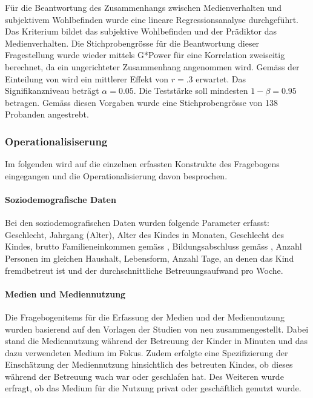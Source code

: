 Für die Beantwortung des Zusammenhangs zwischen Medienverhalten und subjektivem Wohlbefinden wurde eine lineare Regressionsanalyse durchgeführt. Das Kriterium bildet das subjektive Wohlbefinden und der Prädiktor das Medienverhalten. Die Stichprobengrösse für die Beantwortung dieser Fragestellung wurde wieder mittels G*Power für eine Korrelation zweiseitig berechnet, da ein ungerichteter Zusammenhang angenommen wird. Gemäss der Einteilung von  wird ein mittlerer Effekt von $r=.3$ erwartet. Das Signifikanzniveau beträgt $\alpha=0.05$. Die Teststärke soll mindesten $1-\beta=0.95$ betragen. Gemäss diesen Vorgaben wurde eine Stichprobengrösse von 138 Probanden angestrebt.


\subsubsection{Operationalisiserung} \label{sec:Operationalisierung}
Im folgenden wird auf die einzelnen erfassten Konstrukte des Fragebogens eingegangen und die Operationalisierung davon besprochen.

\paragraph{Soziodemografische Daten}\label{sec:SoziodemografischeDaten}
Bei den soziodemografischen Daten wurden folgende Parameter erfasst: Geschlecht, Jahrgang (Alter), Alter des Kindes in Monaten, Geschlecht des Kindes, brutto Familieneinkommen gemäss , Bildungsabschluss gemäss , Anzahl Personen im gleichen Haushalt, Lebensform, Anzahl Tage, an denen das Kind fremdbetreut ist und der durchschnittliche Betreuungsaufwand pro Woche.

\paragraph{Medien und Mediennutzung}\label{sec:MedienMediennutzung}
Die Fragebogenitems für die Erfassung der Medien und der Mediennutzung wurden basierend auf den Vorlagen der Studien von  neu zusammengestellt. Dabei stand die Mediennutzung während der Betreuung der Kinder in Minuten und das dazu verwendeten Medium im Fokus. Zudem erfolgte eine Spezifizierung der Einschätzung der Mediennutzung hinsichtlich des betreuten Kindes, ob dieses während der Betreuung wach war oder geschlafen hat. Des Weiteren wurde erfragt, ob das Medium für die Nutzung privat oder geschäftlich genutzt wurde. 

